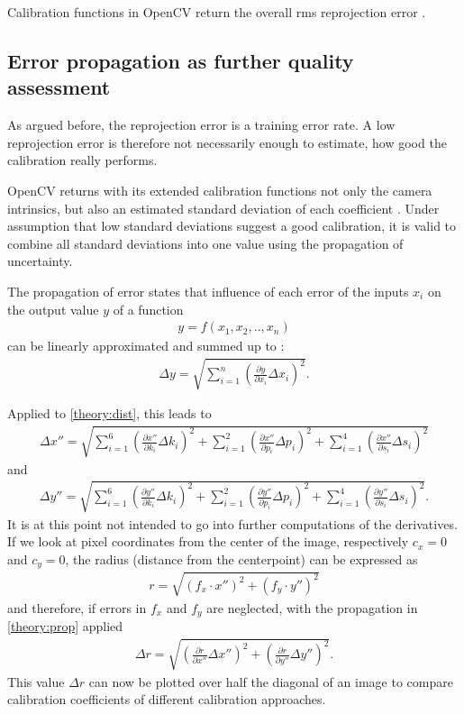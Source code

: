 Calibration functions in OpenCV return the overall \acs{rms} reprojection error \cite{cv_calib}.

\subsection{Error propagation as further quality assessment\label{theory:error_propagation}}
As argued before, the reprojection error is a training error rate.
A low reprojection error is therefore not necessarily enough to estimate, how good the calibration really performs.

OpenCV returns with its extended calibration functions not only the camera intrinsics, but also an estimated standard deviation of each coefficient \cite{cv_calib}.
Under assumption that low standard deviations suggest a good calibration, it is valid to combine all standard deviations into one value using the propagation of uncertainty.

The propagation of error states that influence of each error of the inputs $x_i$ on the output value $y$ of a function
\begin{align*}
	y = f(x_1, x_2,..,x_n)
\end{align*}
can be linearly approximated and summed up to \cite{benno}:
\begin{align}
	\Delta y = \sqrt{\sum_{i=1}^{n}\left(\frac{\partial y}{\partial x_i}\Delta x_i \right)^2} \label{theory:prop}.
\end{align}

Applied to \ref{theory:dist}, this leads to
\begin{align*}
	\Delta x''=\sqrt{\sum_{i=1}^{6}\left(\frac{\partial x''}{\partial k_i}\Delta k_i \right)^2+\sum_{i=1}^{2}\left( \frac{\partial x''}{\partial p_i}\Delta p_i\right)^2+\sum_{i=1}^{4}\left( \frac{\partial x''}{\partial s_i}\Delta s_i\right)^2}
\end{align*}
and
\begin{align*}
	\Delta y''=\sqrt{\sum_{i=1}^{6}\left(\frac{\partial y''}{\partial k_i}\Delta k_i \right)^2+\sum_{i=1}^{2}\left( \frac{\partial y''}{\partial p_i}\Delta p_i\right)^2+\sum_{i=1}^{4}\left( \frac{\partial y''}{\partial s_i}\Delta s_i\right)^2}.
\end{align*}
It is at this point not intended to go into further computations of the derivatives.
If we look at pixel coordinates from the center of the image, respectively $c_x=0$ and $c_y=0$, the radius (distance from the centerpoint) can be expressed as
\begin{align*}
	r = \sqrt{(f_x\cdot x'')^2+(f_y\cdot y'')^2}
\end{align*}
and therefore, if errors in $f_x$ and $f_y$ are neglected, with the propagation in \ref{theory:prop} applied
\begin{align}
	\Delta r = \sqrt{\left(\frac{\partial r}{\partial x''} \Delta x''\right)^2+\left(\frac{\partial r}{\partial y''} \Delta y''\right)^2}\label{theory:delta_r}.
\end{align}
This value $\Delta r$ can now be plotted over half the diagonal of an image to compare calibration coefficients of different calibration approaches.
